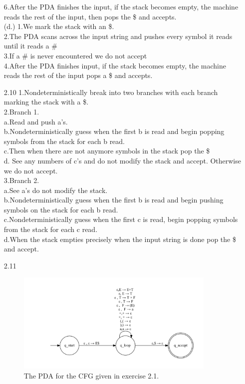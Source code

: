 \documentclass[10pt] {article}
\begin{document}
\begin{enumerate}
6.After the PDA finishes the input, if the stack becomes empty, the machine reads the rest of the input, then pops the \$ and accepts. \\
(d.)
1.We mark the stack with an \$.\\
2.The PDA scans across the input string and pushes every symbol it reads until it reads a \#\\
3.If a \# is never encountered we do not accept\\
4.After the PDA finishes input, if the stack becomes empty, the machine reads the rest of the input pops a \$ and accepts.
\item[2.10]
1.Nondeterministically break into two branches with each branch marking the stack with a \$.\\
2.Branch 1.\\
a.Read and push a's.\\
b.Nondeterministically guess when the first b is read
and begin popping symbols from the stack for each b read.\\
c.Then when there are not anymore symbols in the stack pop the \$ \\
d. See any numbers of c's and do not modify the stack and accept. Otherwise we do not accept.\\
3.Branch 2.\\
a.See a's do not modify the stack.\\
b.Nondeterministically guess when the first
b is read and begin pushing symbols on the stack for each b read.\\
c.Nondeterministically
guess when the first c is read, begin popping symbols from the stack for each c read.\\
d.When the stack empties precisely when the input string is done pop the \$ and accept.
\item[2.11]
\begin{figure}[H]
\includegraphics[width=0.9\textwidth]{a211.pdf}
\caption{The PDA for the CFG given in exercise 2.1.}

\end{figure}
\end{enumerate}
\end{document}
